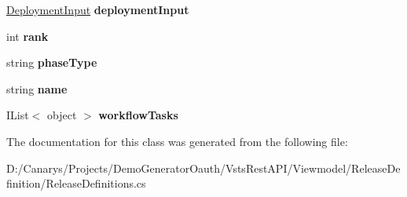 \begin{DoxyCompactItemize}
\item 
\mbox{\label{class_vsts_rest_a_p_i_1_1_viewmodel_1_1_release_definition_1_1_release_definitions_1_1_deploy_phas_add8ab9271cbdc5cbf69bdfe264c03bd0}} 
\mbox{\hyperlink{class_vsts_rest_a_p_i_1_1_viewmodel_1_1_release_definition_1_1_release_definitions_1_1_deployment_input}{Deployment\+Input}} {\bfseries deployment\+Input}
\item 
\mbox{\label{class_vsts_rest_a_p_i_1_1_viewmodel_1_1_release_definition_1_1_release_definitions_1_1_deploy_phas_aa49e4d4097f602a928aa53d2e642aa98}} 
int {\bfseries rank}
\item 
\mbox{\label{class_vsts_rest_a_p_i_1_1_viewmodel_1_1_release_definition_1_1_release_definitions_1_1_deploy_phas_a66dc849eb1219bb4e8ee7aa2032d6eed}} 
string {\bfseries phase\+Type}
\item 
\mbox{\label{class_vsts_rest_a_p_i_1_1_viewmodel_1_1_release_definition_1_1_release_definitions_1_1_deploy_phas_ad22fbe991def025e5251f8d782d45c4e}} 
string {\bfseries name}
\item 
\mbox{\label{class_vsts_rest_a_p_i_1_1_viewmodel_1_1_release_definition_1_1_release_definitions_1_1_deploy_phas_a949c21f6f53a23b783ee52e0a03e507f}} 
I\+List$<$ object $>$ {\bfseries workflow\+Tasks}
\end{DoxyCompactItemize}


The documentation for this class was generated from the following file\+:\begin{DoxyCompactItemize}
\item 
D\+:/\+Canarys/\+Projects/\+Demo\+Generator\+Oauth/\+Vsts\+Rest\+A\+P\+I/\+Viewmodel/\+Release\+Definition/Release\+Definitions.\+cs\end{DoxyCompactItemize}
